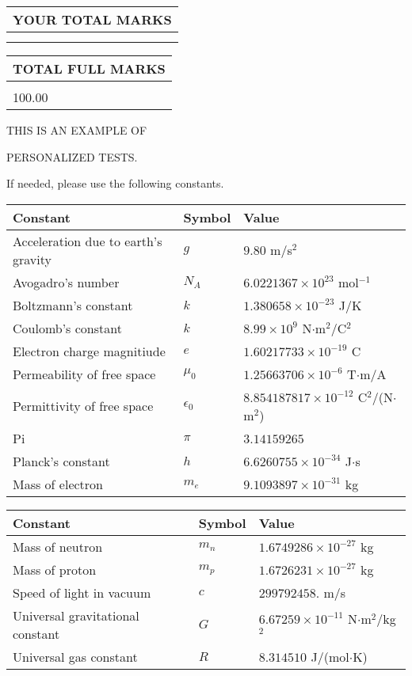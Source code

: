 \documentclass[12pt]{article}
\begin{document}
   
\vspace{0.2in}\noindent\begin{tabular}{|l|}
\hline
YOUR TOTAL MARKS  \\
\hline
 \\ 
 \\ 
\hline
\end{tabular}
\hspace{0.05in} \begin{tabular}{|l|}
\hline
TOTAL FULL MARKS  \\
\hline
 \\ 
100.00 \\
\hline
\end{tabular}
   
   
 \vspace{0.2in}
 
 
{\Huge  THIS IS AN EXAMPLE OF}
 
{\Huge  PERSONALIZED TESTS. }
 
If needed, please use the following constants.
 
 
 
\noindent\begin{tabular}{|l|l|l|}
\hline
Constant & Symbol & Value \\
\hline
Acceleration due to earth's gravity &
$g$ &
 $ 9.80 $
m/s$^2$ \\
\hline
Avogadro's number &
$N_A$ &
 $ 6.0221367 \times 10^{23} $
mol$^{-1}$ \\
\hline
Boltzmann's constant &
$k$ &
 $ 1.380658 \times 10^{-23} $
J/K \\
\hline
Coulomb's constant &
$k$ &
 $ 8.99 \times 10^{9} $
N$\cdot $m$^2$/C$^2$ \\
\hline
Electron charge magnitiude &
$e$ &
 $ 1.60217733 \times 10^{-19} $
C \\
\hline
Permeability of free space &
$\mu _0$ &
 $ 1.25663706 \times 10^{-6} $
T$\cdot $m/A \\
\hline
Permittivity of free space &
$\epsilon _0$ &
 $ 8.854187817 \times 10^{-12} $
C$^2$/(N$\cdot $m$^2$) \\
\hline
Pi &
$\pi$ &
 $ 3.14159265 $
$ $ \\
\hline
Planck's constant &
$h$ &
 $ 6.6260755 \times 10^{-34} $
J$\cdot $s \\
\hline
Mass of electron &
$m_e$ &
 $ 9.1093897 \times 10^{-31} $
kg \\
\hline
\end{tabular}
 
 
\noindent\begin{tabular}{|l|l|l|}
\hline
Constant & Symbol & Value \\
\hline
Mass of neutron &
$m_n$ &
 $ 1.6749286 \times 10^{-27} $
kg \\
\hline
Mass of proton &
$m_p$ &
 $ 1.6726231 \times 10^{-27} $
kg \\
\hline
Speed of light in vacuum &
$c$ &
 $ 299792458. $
m/s \\
\hline
Universal gravitational constant &
$G$ &
 $ 6.67259 \times 10^{-11} $
N$\cdot $m$^2$/kg$^2$ \\
\hline
Universal gas constant &
$R$ &
 $ 8.314510 $
J/(mol$\cdot $K) \\
\hline
\end{tabular}
 
\end{document}
